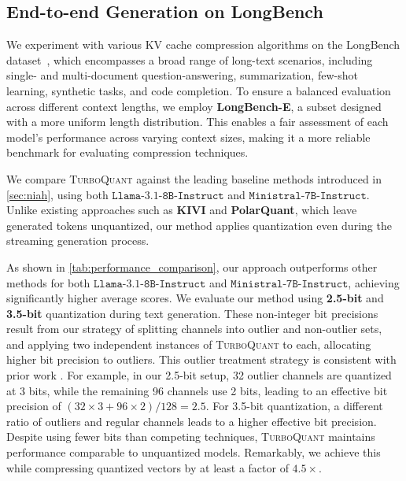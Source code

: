 \documentclass[11pt]{article}
\def\llama{$\mathtt{Llama}$-$\mathtt{3.1}$-$\mathtt{8B}$-$\mathtt{Instruct}$}
\def\mistral{$\mathtt{Ministral}$-$\mathtt{7B}$-$\mathtt{Instruct}$}
\newcommand{\TurboQuant}{\textsc{TurboQuant}\xspace}
\begin{document}

\subsection{End-to-end Generation on LongBench}
\label{sec:exp_kv_end2end}

We experiment with various KV cache compression algorithms on the LongBench dataset~\cite{bai2023longbench}, which encompasses a broad range of long-text scenarios, including single- and multi-document question-answering, summarization, few-shot learning, synthetic tasks, and code completion. To ensure a balanced evaluation across different context lengths, we employ \textbf{LongBench-E}, a subset designed with a more uniform length distribution. This enables a fair assessment of each model’s performance across varying context sizes, making it a more reliable benchmark for evaluating compression techniques.

We compare \TurboQuant against the leading baseline methods introduced in \cref{sec:niah}, using both \llama{} and \mistral{}. Unlike existing approaches such as \textbf{KIVI} and \textbf{PolarQuant}, which leave generated tokens unquantized, our method applies quantization even during the streaming generation process.

As shown in \cref{tab:performance_comparison}, our approach outperforms other methods for both \llama{} and \mistral{}, achieving significantly higher average scores. We evaluate our method using \textbf{2.5-bit} and \textbf{3.5-bit} quantization during text generation. 
These non-integer bit precisions result from our strategy of splitting channels into outlier and non-outlier sets, and applying two independent instances of \TurboQuant to each, allocating higher bit precision to outliers. This outlier treatment strategy is consistent with prior work \cite{zandieh2024qjl, su2025rotatekvaccuraterobust2bit} . 
For example, in our 2.5-bit setup, 32 outlier channels are quantized at 3 bits, while the remaining 96 channels use 2 bits, leading to an effective bit precision of \( (32 \times 3 + 96 \times 2) / 128 = 2.5 \). For 3.5-bit quantization, a different ratio of outliers and regular channels leads to a higher effective bit precision. 
Despite using fewer bits than competing techniques, \TurboQuant maintains performance comparable to unquantized models. Remarkably, we achieve this while compressing quantized vectors by at least a factor of $4.5 \times$.
\end{document}
